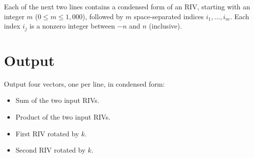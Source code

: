 \documentclass{article}
\begin{document}
Each of the next two lines contains a condensed form of an RIV,
starting with an integer $m$ ($0\le m\le 1{,}000$), followed by $m$ space-separated
indices $i_1, \ldots, i_m$. Each index $i_j$ is a nonzero integer between $-n$
and $n$ (inclusive).

\section{Output}

Output four vectors, one per line, in condensed form:

\begin{itemize}
\item Sum of the two input RIVs.
\item Product of the two input RIVs.
\item First RIV rotated by $k$.
\item Second RIV rotated by $k$.
\end{itemize}

\end{document}
